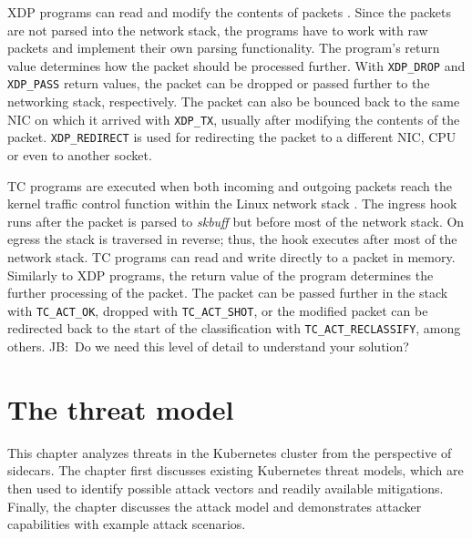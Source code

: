 \documentclass[english, 12pt, a4paper, sci, utf8, a-2b, online]{aaltothesis}
\newcommand{\mycomment}[3]{\textcolor{#1}{#2:~#3}}
\newcommand{\jb}[1]{\noindent\mycomment{aaltoRed}{JB}{#1}}
\begin{document}

XDP programs can read and modify the contents of packets \cite{vieira2020fast}.
Since the packets are not parsed into the network stack, the programs have to work with raw packets and implement their own parsing functionality.
The program's return value determines how the packet should be processed further.
With \texttt{XDP\_DROP} and \texttt{XDP\_PASS} return values, the packet can be dropped or passed further to the networking stack, respectively.
The packet can also be bounced back to the same NIC on which it arrived with \texttt{XDP\_TX}, usually after modifying the contents of the packet.
\texttt{XDP\_REDIRECT} is used for redirecting the packet to a different NIC, CPU or even to another socket.

TC programs are executed when both incoming and outgoing packets reach the kernel traffic control function within the Linux network stack \cite{vieira2020fast}.
The ingress hook runs after the packet is parsed to \emph{skbuff} but before most of the network stack.
On egress the stack is traversed in reverse; thus, the hook executes after most of the network stack.
TC programs can read and write directly to a packet in memory.
Similarly to XDP programs, the return value of the program determines the further processing of the packet.
The packet can be passed further in the stack with \texttt{TC\_ACT\_OK}, dropped with \texttt{TC\_ACT\_SHOT}, or the modified packet can be redirected back to the start of the classification with \texttt{TC\_ACT\_RECLASSIFY}, among others.
\jb{Do we need this level of detail to understand your solution?}

\clearpage

\section{The threat model}

This chapter analyzes threats in the Kubernetes cluster from the perspective of sidecars.
The chapter first discusses existing Kubernetes threat models, which are then used to identify possible attack vectors and readily available mitigations.
Finally, the chapter discusses the attack model and demonstrates attacker capabilities with example attack scenarios.
\end{document}
